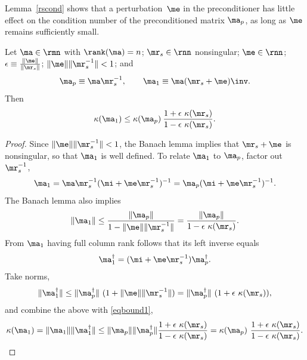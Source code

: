 \documentclass[final]{siamart220329}%
\begin{document}
Lemma~\ref{rscond} shows that a
perturbation~$\me$ in the preconditioner has little effect on the condition number of the preconditioned matrix $\ma_p$, as long as $\me$ remains sufficiently small.

 
\begin{lemma}\label{rscond} 
Let $\ma\in\rmn$ with $\rank(\ma)=n$;
$\mr_s\in\rnn$ nonsingular; $\me\in\rnn$;
$\epsilon\equiv\frac{\|\me\|}{\|\mr_s\|}$;
$\|\me\|\|\mr_s^{-1}\|<1$; and  
\begin{align*}
\ma_p\equiv\ma\mr_s^{-1},\qquad \ma_1\equiv \ma(\mr_s+\me)\inv.
\end{align*}
Then
 \[\kappa(\ma_1)\leq\kappa(\ma_p)\>\frac{1+\epsilon\ \kappa(\mr_s)}{1-\epsilon\ \kappa(\mr_s)}. \]
\end{lemma}

\begin{proof} 
Since $\|\me\|\|\mr_s^{-1}\|<1$, the Banach lemma \cite[Lemma 2.3.3]{GovL13} implies that $\mr_s+\me$ is nonsingular,
so that $\ma_1$ is well defined. 
To relate $\ma_1$ to $\ma_p$, factor out $\mr_s^{-1}$,
\begin{align*}
\ma_1=\ma\mr_s^{-1}(\mi+\me\mr_s^{-1})^{-1}
=\ma_p(\mi+\me\mr_s^{-1})^{-1}.
\end{align*}
The Banach lemma \cite[Lemma 2.3.3]{GovL13} also implies 
\begin{align}\label{eqbound1}
\|\ma_1\|\leq 
\frac{\|\ma_p\|}{1-\|\me\|\|\mr_s^{-1}\|}
=\frac{\|\ma_p\|}{1-\epsilon\ \kappa(\mr_s)}.
\end{align}
From $\ma_1$ having full column rank follows that its
left inverse equals
\begin{align*}
\ma_1^{\dagger}=(\mi+\me\mr_s^{-1})\ma_p^{\dagger}.
\end{align*}
Take norms,
\begin{align*}
\|\ma_1^{\dagger}\|\leq 
\|\ma_p^{\dagger}\|\ (1+\|\me\|\|\mr_s^{-1}\|)
=\|\ma_p^{\dagger}\|\ (1+\epsilon\ \kappa(\mr_s)),
\end{align*}
and combine the above with \eqref{eqbound1}, 
\begin{align*}
\kappa(\ma_1)=\|\ma_1\|\|\ma_1^{\dagger}\|\leq 
\|\ma_p\|\|\ma_p^{\dagger}\|
\frac{1+\epsilon\ \kappa(\mr_s)}{1-\epsilon\ \kappa(\mr_s)}
=\kappa(\ma_p)\ \frac{1+\epsilon\ \kappa(\mr_s)}{1-\epsilon\ \kappa(\mr_s)}.
\end{align*}
\end{proof}
\end{document}
